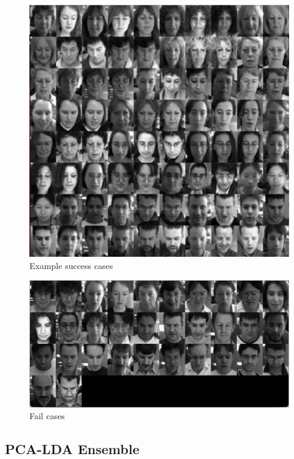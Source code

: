 \documentclass[10pt,technote]{IEEEtran}
\begin{document}
\begin{figure}[htb!]
    \centering
    \includegraphics[width = \linewidth]{../results/ex2LDA/LDA_Example_Successes_crop.png}
    \caption{Example success cases}
    \label{fig:MLDA_success}
\end{figure}

\begin{figure}[htb!]
    \centering
    \includegraphics[width = \linewidth]{../results/ex2LDA/LDA_Example_Failiures.png}
    \caption{Fail cases}
    \label{fig:MLDA_fail}
\end{figure}

\subsection{PCA-LDA Ensemble}
\end{document}
